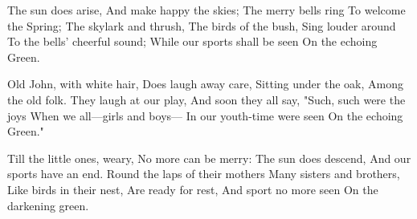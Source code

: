 
\begin{poem}

\begin{stanza}
The sun does arise,\verseline
And make happy the skies;\verseline
The merry bells ring\verseline
To welcome the Spring;\verseline
The skylark and thrush,\verseline
The birds of the bush,\verseline
Sing louder around\verseline
To the bells' cheerful sound;\verseline
While our sports shall be seen\verseline
On the echoing Green.
\end{stanza}
\begin{stanza}
\verseindent Old John, with white hair,\verseline
Does laugh away care,\verseline
Sitting under the oak,\verseline
Among the old folk.\verseline
They laugh at our play,\verseline
And soon they all say,\verseline
"Such, such were the joys\verseline
When we all—girls and boys—\verseline
In our youth-time were seen\verseline
On the echoing Green."
\end{stanza}
\begin{stanza}
\verseindent Till the little ones, weary,\verseline
No more can be merry:\verseline
The sun does descend,\verseline
And our sports have an end.\verseline
Round the laps of their mothers\verseline
Many sisters and brothers,\verseline
Like birds in their nest,\verseline
Are ready for rest,\verseline
And sport no more seen\verseline
On the darkening green.
\end{stanza}

\end{poem}